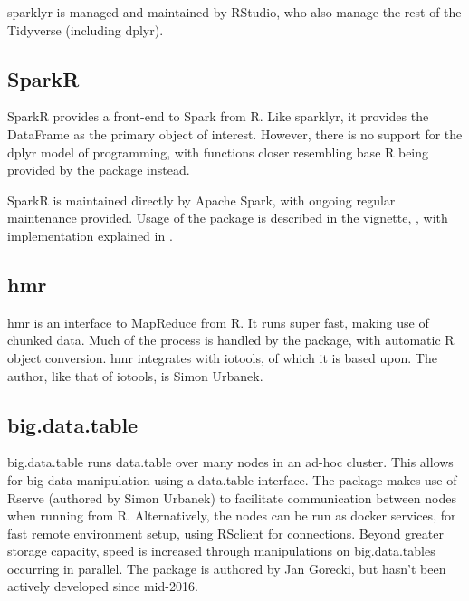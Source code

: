 sparklyr is managed and maintained by RStudio, who also manage the rest
of the Tidyverse (including dplyr).

\hypertarget{sec:sparklyr}{%
    \subsection{SparkR}\label{sec:sparklyr}}

SparkR provides a front-end to Spark from
R\cite{venkataraman20:_spark}. Like sparklyr, it provides the DataFrame
as the primary object of interest. However, there is no support for the
dplyr model of programming, with functions closer resembling base R
being provided by the package instead.

SparkR is maintained directly by Apache Spark, with ongoing regular
maintenance provided. Usage of the package is described in the vignette,
\cite{venktaraman19:_spark_pract_guide}, with implementation
explained in \cite{venkataraman2016sparkr}.

\hypertarget{sec:hmr}{%
    \subsection{hmr}\label{sec:hmr}}

hmr is an interface to MapReduce from R\cite{urbanek20}. It runs super
fast, making use of chunked data. Much of the process is handled by the
package, with automatic R object conversion. hmr integrates with
iotools, of which it is based upon. The author, like that of iotools, is
Simon Urbanek.

\hypertarget{sec:big.data.table}{%
    \subsection{big.data.table}\label{sec:big.data.table}}

big.data.table runs data.table over many nodes in an ad-hoc
cluster\cite{gorecki16}. This allows for big data manipulation using a
data.table interface. The package makes use of Rserve (authored by Simon
Urbanek) to facilitate communication between nodes when running from R.
Alternatively, the nodes can be run as docker services, for fast remote
environment setup, using RSclient for connections. Beyond greater
storage capacity, speed is increased through manipulations on
big.data.tables occurring in parallel. The package is authored by Jan
Gorecki, but hasn't been actively developed since mid-2016.